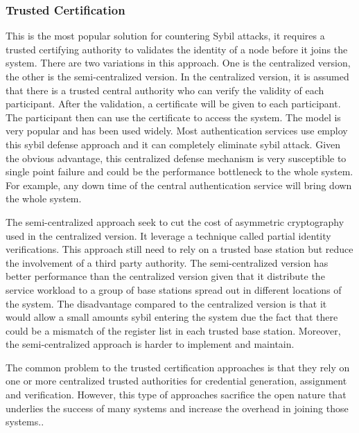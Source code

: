 \documentclass[conference]{IEEEtran}
\begin{document}
\subsubsection{Trusted Certification}
This is the most popular solution for countering Sybil attacks, it requires a trusted certifying authority to validates the identity of a node before it joins the system. There are two variations in this approach. One is the centralized version, the other is the semi-centralized version. In the centralized version, it is assumed that there is a trusted central authority who can verify the validity of each participant. After the validation, a certificate will be given to each participant. The participant then can use the certificate to access the system. The model is very popular and has been used widely. Most authentication services use employ this sybil defense approach and it can completely eliminate sybil attack. Given the obvious advantage, this centralized defense mechanism is very susceptible to single point failure and could be the performance bottleneck to the whole system. For example, any down time of the central authentication service will bring down the whole system.

The semi-centralized approach seek to cut the cost of asymmetric cryptography used in the centralized version. It leverage a technique called partial identity verifications. This approach still need to rely on a trusted base station but reduce the involvement of a third party authority. The semi-centralized version has better performance than the centralized version given that it distribute the service workload to a group of base stations spread out in different locations of the system. The disadvantage compared to the centralized version is that it would allow a small amounts sybil entering the system due the fact that there could be a mismatch of the register list in each trusted base station. Moreover, the semi-centralized approach is harder to implement and maintain. 

The common problem to the trusted certification approaches is that they rely on one or more centralized trusted authorities for credential generation, assignment and verification. However, this type of approaches sacrifice the open nature that underlies the success of many systems and increase the overhead in joining those systems.\cite{newsome04sybil}\cite{Castro02Secure}\cite{Adya02FFA}.
\end{document}
